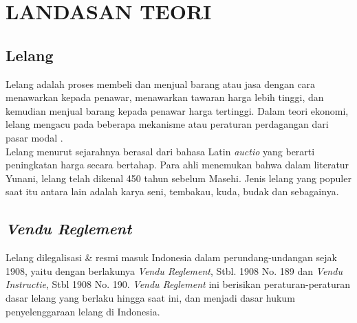 \chapter{LANDASAN TEORI}{}

  \section{Lelang}
  Lelang adalah proses membeli dan menjual barang atau jasa dengan cara menawarkan kepada penawar, menawarkan tawaran harga lebih tinggi, dan kemudian menjual barang kepada penawar harga tertinggi. Dalam teori ekonomi, lelang mengacu pada beberapa mekanisme atau peraturan perdagangan dari pasar modal \cite{balailelang_sejarah_nodate}.
  \\ \indent
  Lelang menurut sejarahnya berasal dari bahasa Latin \textit{auctio} yang berarti peningkatan harga secara bertahap. Para ahli menemukan bahwa dalam literatur Yunani, lelang telah dikenal 450 tahun sebelum Masehi. Jenis lelang yang populer saat itu antara lain adalah karya seni, tembakau, kuda, budak dan sebagainya\cite{pratama_lelang_2012}.
  
  
  \section{\textit{Vendu Reglement}}
  Lelang dilegalisasi \& resmi masuk Indonesia dalam perundang-undangan sejak 1908, yaitu dengan berlakunya \textit{Vendu Reglement}, Stbl. 1908 No. 189 dan \textit{Vendu Instructie}, Stbl 1908 No. 190. \textit{Vendu Reglement} ini berisikan peraturan-peraturan dasar lelang yang berlaku hingga saat ini, dan menjadi dasar hukum penyelenggaraan lelang di Indonesia\cite{balailelang_sejarah_nodate}.
  
 
